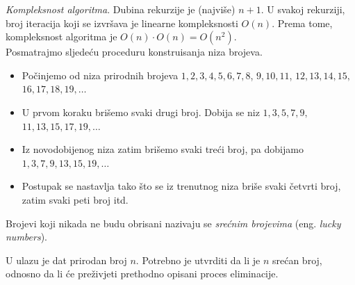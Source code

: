 \emph{Kompleksnost algoritma}. Dubina rekurzije je (najviše) $n+1$. U svakoj rekurziji, broj iteracija koji se izvršava je linearne kompleksnosti $O(n)$. Prema tome, kompleksnost algoritma je $O(n) \cdot O(n) = O(n^2)$.  \\


 
 Posmatrajmo sljedeću proceduru konstruisanja niza brojeva.
 
 \begin{itemize}
 	\item Počinjemo od niza prirodnih brojeva
 	$1, 2, 3, 4, 5, 6, 7, 8$, $9, 10, 11$, $12, 13, 14, 15,$ $16, 17, 18, 19,\ldots 	$
 	
 	\item U prvom koraku brišemo svaki drugi broj. Dobija se niz $1, 3, 5, 7, 9,$ $11, 13, 15, 17, 19,\ldots$
 	
 	\item Iz novodobijenog niza zatim brišemo svaki treći broj, pa dobijamo $
 	1, 3, 7, 9, 13, 15, 19,\ldots
 	$
 	
 	\item Postupak se nastavlja tako što se iz trenutnog niza briše svaki četvrti broj, zatim svaki peti broj itd.
 	
 \end{itemize}
 
 Brojevi koji nikada ne budu obrisani nazivaju se \textit{srećnim brojevima} (eng. \textit{lucky numbers}).
 
 \medskip
 
 U ulazu je dat prirodan broj $n$. Potrebno je utvrditi da li je $n$ srećan broj, odnosno da li će preživjeti prethodno opisani proces eliminacije.
 
